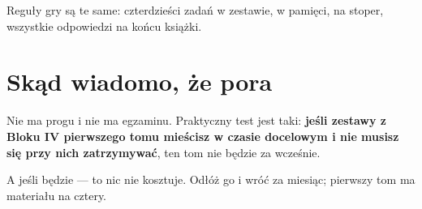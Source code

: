\noindent
Reguły gry są te same: czterdzieści zadań w zestawie, w pamięci, na stoper,
wszystkie odpowiedzi na końcu książki.

\section*{Skąd wiadomo, że pora}

Nie ma progu i nie ma egzaminu. Praktyczny test jest taki: \textbf{jeśli
zestawy z Bloku IV pierwszego tomu mieścisz w czasie docelowym i nie musisz się
przy nich zatrzymywać}, ten tom nie będzie za wcześnie.

A jeśli będzie — to nic nie kosztuje. Odłóż go i wróć za miesiąc; pierwszy tom
ma materiału na cztery.
